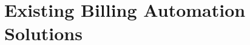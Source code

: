 \section{Existing Billing Automation Solutions}\label{sec:existing-billing-automation-solutions}





